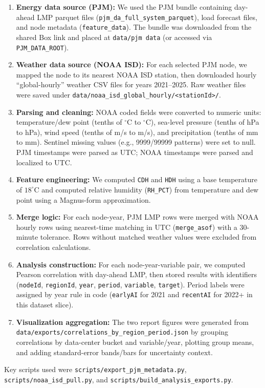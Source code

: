 \documentclass[11pt]{article}
\begin{document}
\begin{enumerate}
    \item \textbf{Energy data source (PJM):} We used the PJM bundle containing day-ahead LMP parquet files (\texttt{pjm\_da\_full\_system\_parquet}), load forecast files, and node metadata (\texttt{feature\_data}). The bundle was downloaded from the shared Box link and placed at \texttt{data/pjm data} (or accessed via \texttt{PJM\_DATA\_ROOT}).
    \item \textbf{Weather data source (NOAA ISD):} For each selected PJM node, we mapped the node to its nearest NOAA ISD station, then downloaded hourly ``global-hourly'' weather CSV files for years 2021--2025. Raw weather files were saved under \texttt{data/noaa\_isd\_global\_hourly/<stationId>/}.
    \item \textbf{Parsing and cleaning:} NOAA coded fields were converted to numeric units: temperature/dew point (tenths of \(^\circ\)C to \(^\circ\)C), sea-level pressure (tenths of hPa to hPa), wind speed (tenths of m/s to m/s), and precipitation (tenths of mm to mm). Sentinel missing values (e.g., 9999/99999 patterns) were set to null. PJM timestamps were parsed as UTC; NOAA timestamps were parsed and localized to UTC.
    \item \textbf{Feature engineering:} We computed \texttt{CDH} and \texttt{HDH} using a base temperature of \(18^\circ\)C and computed relative humidity (\texttt{RH\_PCT}) from temperature and dew point using a Magnus-form approximation.
    \item \textbf{Merge logic:} For each node-year, PJM LMP rows were merged with NOAA hourly rows using nearest-time matching in UTC (\texttt{merge\_asof}) with a 30-minute tolerance. Rows without matched weather values were excluded from correlation calculations.
    \item \textbf{Analysis construction:} For each node-year-variable pair, we computed Pearson correlation with day-ahead LMP, then stored results with identifiers (\texttt{nodeId}, \texttt{regionId}, \texttt{year}, \texttt{period}, \texttt{variable}, \texttt{target}). Period labels were assigned by year rule in code (\texttt{earlyAI} for 2021 and \texttt{recentAI} for 2022+ in this dataset slice).
    \item \textbf{Visualization aggregation:} The two report figures were generated from \texttt{data/exports/correlations\_by\_region\_period.json} by grouping correlations by data-center bucket and variable/year, plotting group means, and adding standard-error bands/bars for uncertainty context.
\end{enumerate}
Key scripts used were \texttt{scripts/export\_pjm\_metadata.py}, \texttt{scripts/noaa\_isd\_pull.py}, and \texttt{scripts/build\_analysis\_exports.py}.
\end{document}
